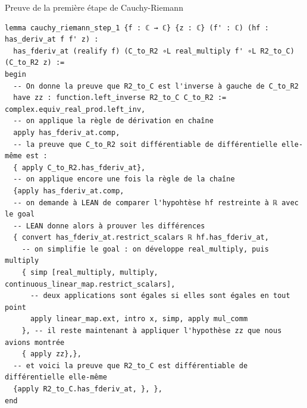 \documentclass[a4paper, 11pt, twoside]{report}
\begin{document}
\begin{code}{Preuve de la première étape de Cauchy-Riemann}
\begin{lstlisting}
lemma cauchy_riemann_step_1 {f : ℂ → ℂ} {z : ℂ} (f' : ℂ) (hf : has_deriv_at f f' z) : 
  has_fderiv_at (realify f) (C_to_R2 ∘L real_multiply f' ∘L R2_to_C) (C_to_R2 z) := 
begin
  -- On donne la preuve que R2_to_C est l'inverse à gauche de C_to_R2
  have zz : function.left_inverse R2_to_C C_to_R2 := complex.equiv_real_prod.left_inv,
  -- on applique la règle de dérivation en chaîne
  apply has_fderiv_at.comp,
  -- la preuve que C_to_R2 soit différentiable de différentielle elle-même est :
  { apply C_to_R2.has_fderiv_at},
  -- on applique encore une fois la règle de la chaîne
  {apply has_fderiv_at.comp,
  -- on demande à LEAN de comparer l'hypohtèse hf restreinte à ℝ avec le goal
  -- LEAN donne alors à prouver les différences
  { convert has_fderiv_at.restrict_scalars ℝ hf.has_fderiv_at,
    -- on simplifie le goal : on développe real_multiply, puis multiply
    { simp [real_multiply, multiply, continuous_linear_map.restrict_scalars],
      -- deux applications sont égales si elles sont égales en tout point
      apply linear_map.ext, intro x, simp, apply mul_comm
    }, -- il reste maintenant à appliquer l'hypothèse zz que nous avions montrée
    { apply zz},},
  -- et voici la preuve que R2_to_C est différentiable de différentielle elle-même
  {apply R2_to_C.has_fderiv_at, }, },
end
\end{lstlisting}
\end{code}
\end{document}
